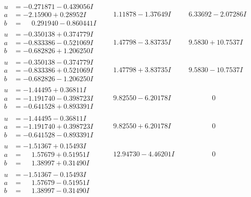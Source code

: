 \documentclass[1p]{elsarticle_modified}
\theoremstyle{definition}
\begin{document}
$$\begin{array}{c|c|c}
\begin{aligned}
u &= -0.271871 - 0.439056 I \\
a &= -2.15900 + 0.28952 I \\
b &= \phantom{-}0.291940 - 0.860441 I\end{aligned}
 & \phantom{-}1.11878 - 1.37649 I & \phantom{-}6.33692 - 2.07286 I \\ \hline\begin{aligned}
u &= -0.350138 + 0.374779 I \\
a &= -0.833386 - 0.521069 I \\
b &= -0.682826 + 1.206250 I\end{aligned}
 & \phantom{-}1.47798 - 3.83735 I & \phantom{-}9.5830 + 10.7537 I \\ \hline\begin{aligned}
u &= -0.350138 - 0.374779 I \\
a &= -0.833386 + 0.521069 I \\
b &= -0.682826 - 1.206250 I\end{aligned}
 & \phantom{-}1.47798 + 3.83735 I & \phantom{-}9.5830 - 10.7537 I \\ \hline\begin{aligned}
u &= -1.44495 + 0.36811 I \\
a &= -1.191740 - 0.398723 I \\
b &= -0.641528 + 0.893391 I\end{aligned}
 & \phantom{-}9.82550 - 6.20178 I & \phantom{-0.000000 } 0 \\ \hline\begin{aligned}
u &= -1.44495 - 0.36811 I \\
a &= -1.191740 + 0.398723 I \\
b &= -0.641528 - 0.893391 I\end{aligned}
 & \phantom{-}9.82550 + 6.20178 I & \phantom{-0.000000 } 0 \\ \hline\begin{aligned}
u &= -1.51367 + 0.15493 I \\
a &= \phantom{-}1.57679 + 0.51951 I \\
b &= \phantom{-}1.38997 + 0.31490 I\end{aligned}
 & \phantom{-}12.94730 - 4.46201 I & \phantom{-0.000000 } 0 \\ \hline\begin{aligned}
u &= -1.51367 - 0.15493 I \\
a &= \phantom{-}1.57679 - 0.51951 I \\
b &= \phantom{-}1.38997 - 0.31490 I\end{aligned}

\end{array}$$
\end{document}
